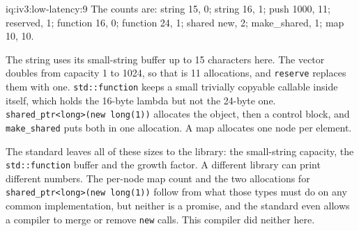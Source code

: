 \begin{solution}{iq:iv3:low-latency:9}
The counts are: string 15, 0; string 16, 1; push 1000, 11; reserved, 1; function 16, 0; function 24, 1; shared new, 2; make\_shared, 1; map 10, 10.

The string uses its small-string buffer up to 15 characters here. The vector doubles from capacity 1 to 1024, so that is 11 allocations, and \texttt{reserve} replaces them with one. \texttt{std::function} keeps a small trivially copyable callable inside itself, which holds the 16-byte lambda but not the 24-byte one. \texttt{shared\_ptr<long>(new long(1))} allocates the object, then a control block, and \texttt{make\_shared} puts both in one allocation. A map allocates one node per element.

The standard leaves all of these sizes to the library: the small-string capacity, the \texttt{std::function} buffer and the growth factor. A different library can print different numbers. The per-node map count and the two allocations for \texttt{shared\_ptr<long>(new long(1))} follow from what those types must do on any common implementation, but neither is a promise, and the standard even allows a compiler to merge or remove \texttt{new} calls. This compiler did neither here.

\end{solution}

